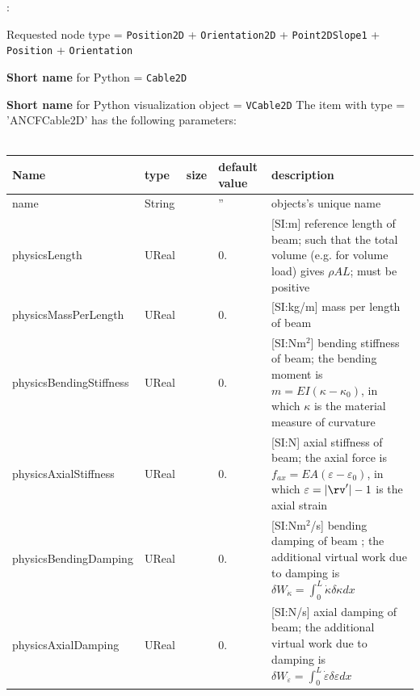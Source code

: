 \noindent {}:
\bi
  \item Requested node type = \texttt{Position2D} + \texttt{Orientation2D} + \texttt{Point2DSlope1} + \texttt{Position} + \texttt{Orientation}
  \item {\bf Short name} for Python = \texttt{Cable2D}
  \item {\bf Short name} for Python visualization object = \texttt{VCable2D}
\ei\vspace{12pt} \noindent 
The item  with type = 'ANCFCable2D' has the following parameters:
\vspace{-0.5cm}\\
\vspace{-0.5cm}\\
\begin{center}
  \footnotesize
  \begin{longtable}{| p{4.5cm} | p{2.5cm} | p{0.5cm} | p{2.5cm} | p{6cm} |}
    \hline
    \bf Name & \bf type & \bf size & \bf default value & \bf description \\ \hline
    name &     String &      &     '' &     objects's unique name\\ \hline
    physicsLength &     UReal &      &     0. &      [SI:m] reference length of beam; such that the total volume (e.g. for volume load) gives $\rho A L$; must be positive\\ \hline
    physicsMassPerLength &     UReal &      &     0. &      [SI:kg/m] mass per length of beam\\ \hline
    physicsBendingStiffness &     UReal &      &     0. &      [SI:Nm$^2$] bending stiffness of beam; the bending moment is $m = EI (\kappa - \kappa_0)$, in which $\kappa$ is the material measure of curvature\\ \hline
    physicsAxialStiffness &     UReal &      &     0. &      [SI:N] axial stiffness of beam; the axial force is $f_{ax} = EA (\varepsilon -\varepsilon_0)$, in which $\varepsilon = |\rv^\prime|-1$ is the axial strain\\ \hline
    physicsBendingDamping &     UReal &      &     0. &      [SI:Nm$^2$/s] bending damping of beam ; the additional virtual work due to damping is $\delta W_{\dot \kappa} = \int_0^L \dot \kappa \delta \kappa dx$\\ \hline
    physicsAxialDamping &     UReal &      &     0. &      [SI:N/s] axial damping of beam; the additional virtual work due to damping is $\delta W_{\dot\varepsilon} = \int_0^L \dot \varepsilon \delta \varepsilon dx$\\ \hline

\end{longtable}
\end{center}
